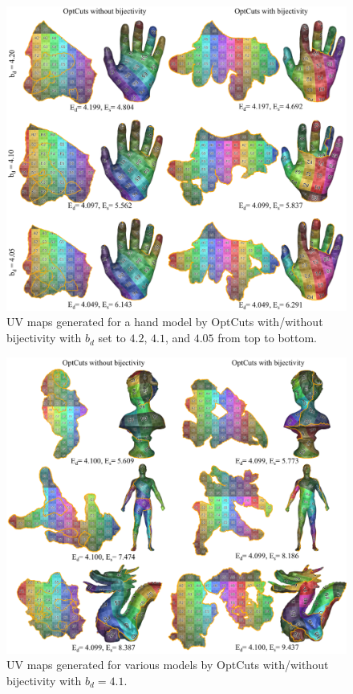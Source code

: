 \begin{figure}[t]
\centering
\includegraphics[width=\linewidth]{fig/our_impressive_results_left.png}
\caption{UV maps generated for a hand model by OptCuts with/without bijectivity with $b_d$ set to $4.2$, $4.1$, and $4.05$ from top to bottom.}
\label{fig:ours_various_bounds}
\end{figure}
%
\begin{figure}[t]
\centering
\includegraphics[width=\linewidth]{fig/our_impressive_results_right.png}
\caption{UV maps generated for various models by OptCuts with/without bijectivity with $b_d = 4.1$.}
\label{fig:our_impressive_results}
\end{figure}

